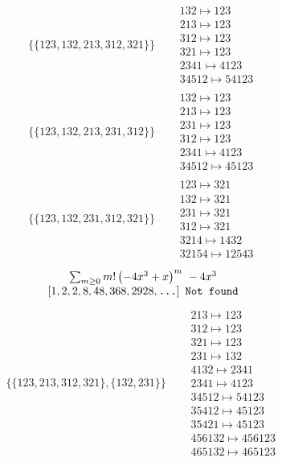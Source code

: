 \begin{tiny}
\begin{align}
\{\{123, 132, 213, 312, 321\}\}
\quad
&
\begin{matrix}
132 \mapsto 123\\213 \mapsto 123\\312 \mapsto 123\\321 \mapsto 123\\2341 \mapsto 4123\\34512 \mapsto 54123
\end{matrix}
\\
\{\{123, 132, 213, 231, 312\}\}
\quad
&
\begin{matrix}
132 \mapsto 123\\213 \mapsto 123\\231 \mapsto 123\\312 \mapsto 123\\2341 \mapsto 4123\\34512 \mapsto 45123
\end{matrix}
\\
\{\{123, 132, 231, 312, 321\}\}
\quad
&
\begin{matrix}
123 \mapsto 321\\132 \mapsto 321\\231 \mapsto 321\\312 \mapsto 321\\3214 \mapsto 1432\\32154 \mapsto 12543
\end{matrix}
\end{align}
$$
\begin{matrix}
\sum_{m \geq 0} m! \left(
-4 x^{3} + x
\right)^m
\ 
-4 x^{3}
\\
\left[1, 2, 2, 8, 48, 368, 2928, \text{\texttt{...}}\right]
\ 
\texttt{Not found}
\end{matrix}
$$
\vspace{-1em}
\begin{align}
\{\{123, 213, 312, 321\}, \{132, 231\}\}
\quad
&
\begin{matrix}
213 \mapsto 123\\312 \mapsto 123\\321 \mapsto 123\\231 \mapsto 132\\4132 \mapsto 2341\\2341 \mapsto 4123\\34512 \mapsto 54123\\35412 \mapsto 45123\\35421 \mapsto 45123\\456132 \mapsto 456123\\465132 \mapsto 465123

\end{matrix}
\end{align}
\end{tiny}
